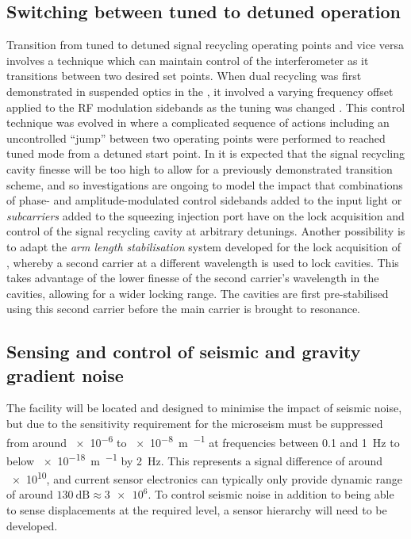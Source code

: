 \subsection{Switching between tuned to detuned operation}
Transition from tuned to detuned signal recycling operating points and vice versa involves a technique which can maintain control of the interferometer as it transitions between two desired set points. When dual recycling was first demonstrated in suspended optics in the \GARCHINGPROTOTYPE{}, it involved a varying frequency offset applied to the \gls{RF} modulation sidebands as the tuning was changed \cite{Freise2000}. This control technique was evolved in \GEO{} where a complicated sequence of actions \cite{Grote2004} including an uncontrolled ``jump'' between two operating points \cite{Hild2007} were performed to reached tuned mode from a detuned start point. In \ETLF{} it is expected that the signal recycling cavity finesse will be too high to allow for a previously demonstrated transition scheme, and so investigations are ongoing to model the impact that combinations of phase- and amplitude-modulated control sidebands added to the input light or \emph{subcarriers} added to the squeezing injection port have on the lock acquisition and control of the signal recycling cavity at arbitrary detunings. Another possibility is to adapt the \emph{arm length stabilisation} system developed for the lock acquisition of \ALIGO{} \cite{Mullavey2012, Staley2014}, whereby a second carrier at a different wavelength is used to lock cavities. This takes advantage of the lower finesse of the second carrier's wavelength in the cavities, allowing for a wider locking range. The cavities are first pre-stabilised using this second carrier before the main carrier is brought to resonance.

\subsection{Sensing and control of seismic and gravity gradient noise}
The \ET{} facility will be located and designed to minimise the impact of seismic noise, but due to the sensitivity requirement for \ETLF{} the microseism must be suppressed from around \num{e-6} to \SI{e-8}{\meter\per\sqrthz} at frequencies between \num{0.1} and \SI{1}{\hertz} to below \SI{e-18}{\meter\per\sqrthz} by \SI{2}{\hertz}. This represents a signal difference of around \num{e10}, and current sensor electronics can typically only provide dynamic range of around $\SI{130}{\deci\bel} \approx \num{3e6}$. To control seismic noise in addition to being able to sense displacements at the required level, a sensor hierarchy will need to be developed.

